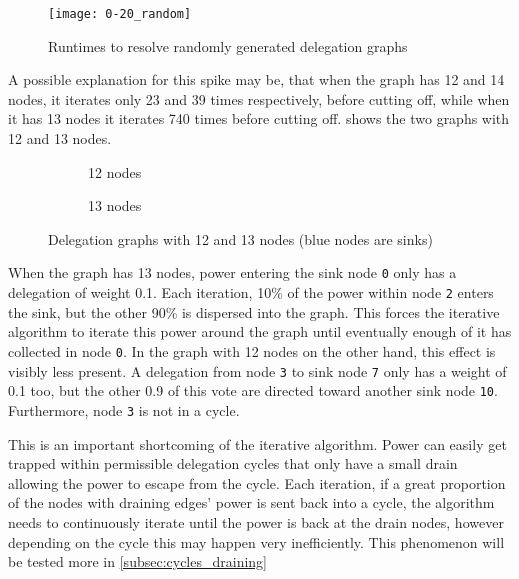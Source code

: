\begin{figure}[t]
    \centering
    \texttt{[image: 0-20\_random]}
    \caption{Runtimes to resolve randomly generated delegation graphs}
    \label{fig:random-tiny}
\end{figure}

A possible explanation for this spike may be, that when the graph has 12 and 14 nodes, it iterates only 23 and 39 times respectively, before cutting off, while when it has 13 nodes it iterates 740 times before cutting off.  shows the two graphs with 12 and 13 nodes.

\begin{figure}[t]
    \centering
    \begin{subfigure}[t]{0.45\textwidth}
        \centering
        \caption{12 nodes}
        \label{subfig:random-12and13-12}
    \end{subfigure}
    \hfill
    \begin{subfigure}[t]{0.45\textwidth}
        \centering
        \caption{13 nodes}
        \label{subfig:random-12and13-13}
    \end{subfigure}
    \caption{Delegation graphs with 12 and 13 nodes (blue nodes are sinks)}
    \label{fig:random-12and13}
\end{figure}

When the graph has 13 nodes, power entering the sink node \texttt{0} only has a delegation of weight 0.1. Each iteration, 10\% of the power within node \texttt{2} enters the sink, but the other 90\% is dispersed into the graph. This forces the iterative algorithm to iterate this power around the graph until eventually enough of it has collected in node \texttt{0}. In the graph with 12 nodes on the other hand, this effect is visibly less present. A delegation from node \texttt{3} to sink node \texttt{7} only has a weight of 0.1 too, but the other 0.9 of this vote are directed toward another sink node \texttt{10}. Furthermore, node \texttt{3} is not in a cycle. 

This is an important shortcoming of the iterative algorithm. Power can easily get trapped within permissible delegation cycles that only have a small drain allowing the power to escape from the cycle. Each iteration, if a great proportion of the nodes with draining edges' power is sent back into a cycle, the algorithm needs to continuously iterate until the power is back at the drain nodes, however depending on the cycle this may happen very inefficiently. This phenomenon will be tested more in \cref{subsec:cycles_draining}

